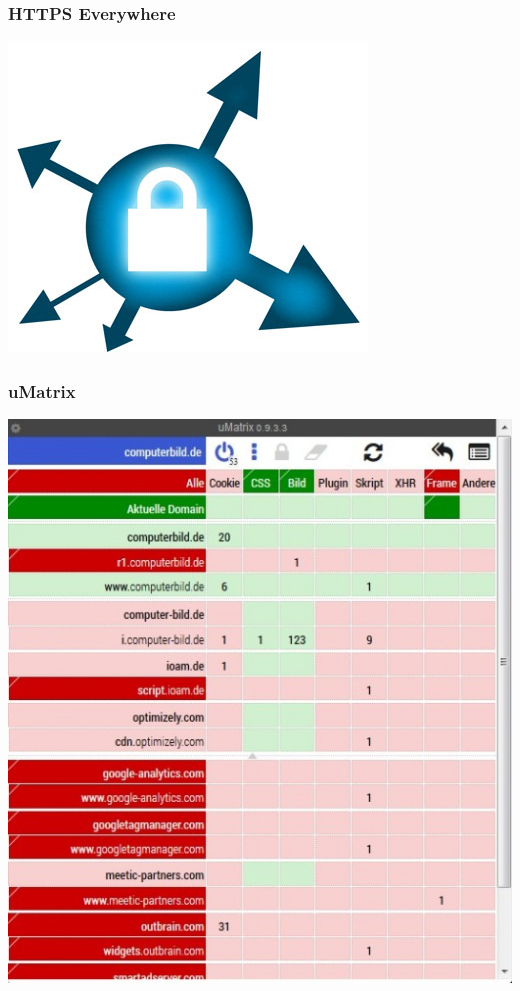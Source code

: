 \documentclass[12pt, table]{beamer}
\begin{document}
\begin{frame}
    \frametitle{HTTPS Everywhere}
    \begin{center}
    	\includegraphics[height=0.7\textheight]{../img/https_everywhere.png}
    \end{center}
\end{frame}

\begin{frame}
    \frametitle{uMatrix}
    \begin{center}
    	\includegraphics[height=0.7\textheight]{../img/umatrix.jpg}
    \end{center}
\end{frame}
\end{document}
